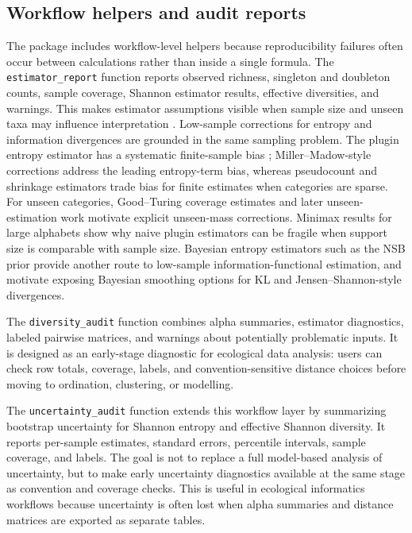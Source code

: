 \documentclass[preprint,12pt,authoryear]{elsarticle}
\begin{document}
\subsection{Workflow helpers and audit reports}

The package includes workflow-level helpers because reproducibility failures
often occur between calculations rather than inside a single formula.  The
\texttt{estimator\_report} function reports observed richness, singleton and
doubleton counts, sample coverage, Shannon estimator results, effective
diversities, and warnings.  This makes estimator assumptions visible when
sample size and unseen taxa may influence interpretation
\citep{chao2003nonparametric}.
Low-sample corrections for entropy and information divergences are grounded in
the same sampling problem.  The plugin entropy estimator has a systematic
finite-sample bias \citep{paninski2003entropy}; Miller--Madow-style corrections
address the leading entropy-term bias, whereas pseudocount and shrinkage
estimators trade bias for finite estimates when categories are sparse.  For
unseen categories, Good--Turing coverage estimates \citep{good1953population}
and later unseen-estimation work \citep{valiant2017estimating} motivate
explicit unseen-mass corrections.  Minimax results for large alphabets
\citep{jiao2015minimax,wu2016minimax} show why naive plugin estimators can be
fragile when support size is comparable with sample size.  Bayesian entropy
estimators such as the NSB prior \citep{nemenman2002entropy} provide another
route to low-sample information-functional estimation, and motivate exposing
Bayesian smoothing options for KL and Jensen--Shannon-style divergences.

The \texttt{diversity\_audit} function combines alpha summaries, estimator
diagnostics, labeled pairwise matrices, and warnings about potentially
problematic inputs.  It is designed as an early-stage diagnostic for ecological
data analysis: users can check row totals, coverage, labels, and
convention-sensitive distance choices before moving to ordination, clustering,
or modelling.

The \texttt{uncertainty\_audit} function extends this workflow layer by
summarizing bootstrap uncertainty for Shannon entropy and effective Shannon
diversity.  It reports per-sample estimates, standard errors, percentile
intervals, sample coverage, and labels.  The goal is not to replace a full
model-based analysis of uncertainty, but to make early uncertainty diagnostics
available at the same stage as convention and coverage checks.  This is useful
in ecological informatics workflows because uncertainty is often lost when
alpha summaries and distance matrices are exported as separate tables.
\end{document}
